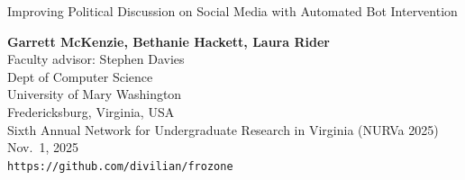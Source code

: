 \documentclass[12pt]{beamer}
\begin{document}
\begin{frame}[c]{}

\begin{center}
\Large

Improving Political Discussion on Social Media
with Automated Bot Intervention

\footnotesize
\textbf{Garrett McKenzie, Bethanie Hackett, Laura Rider}\\
\smallskip
\scriptsize
Faculty advisor: Stephen Davies \\
\medskip
Dept of Computer Science\\
University of Mary Washington\\
Fredericksburg, Virginia, USA\\
\bigskip
\bigskip
\scriptsize
Sixth Annual Network for Undergraduate Research in Virginia (NURVa 2025)\\
\bigskip
\scriptsize
Nov.~1, 2025\\
\texttt{https://github.com/divilian/frozone}
\end{center}

\end{frame}
\end{document}
